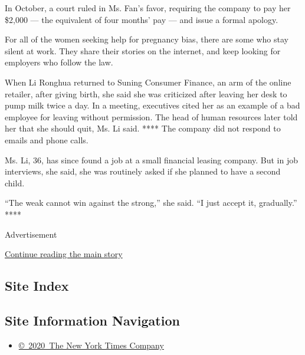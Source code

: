 In October, a court ruled in Ms. Fan's favor, requiring the company to
pay her \$2,000 --- the equivalent of four months' pay --- and issue a
formal apology.

For all of the women seeking help for pregnancy bias, there are some who
stay silent at work. They share their stories on the internet, and keep
looking for employers who follow the law.

When Li Ronghua returned to Suning Consumer Finance, an arm of the
online retailer, after giving birth, she said she was criticized after
leaving her desk to pump milk twice a day. In a meeting, executives
cited her as an example of a bad employee for leaving without
permission. The head of human resources later told her that she should
quit, Ms. Li said. **** The company did not respond to emails and phone
calls.

Ms. Li, 36, has since found a job at a small financial leasing company.
But in job interviews, she said, she was routinely asked if she planned
to have a second child.

``The weak cannot win against the strong,'' she said. ``I just accept
it, gradually.'' ****

Advertisement

\protect\hyperlink{after-bottom}{Continue reading the main story}

\hypertarget{site-index}{%
\subsection{Site Index}\label{site-index}}

\hypertarget{site-information-navigation}{%
\subsection{Site Information
Navigation}\label{site-information-navigation}}

\begin{itemize}
\tightlist
\item
  \href{https://help.nytimes.com/hc/en-us/articles/115014792127-Copyright-notice}{©~2020~The
  New York Times Company}
\end{itemize}

